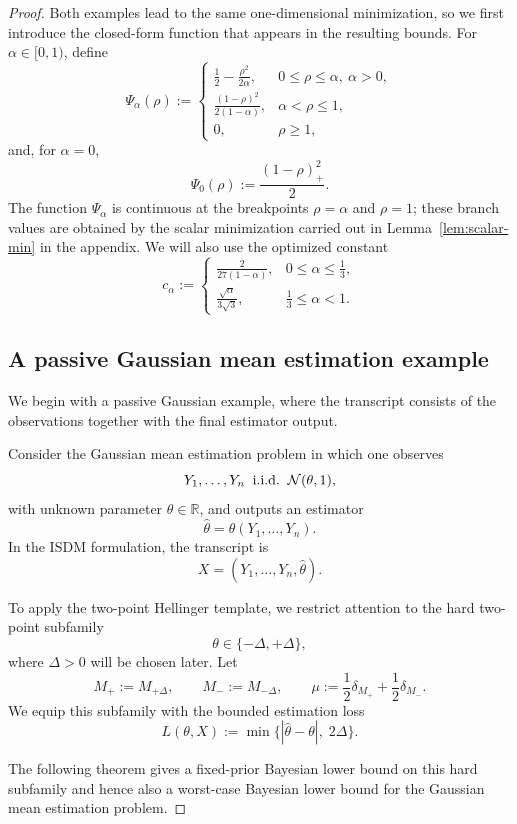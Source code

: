 \documentclass[conference]{IEEEtran}
\begin{document}
\begin{proof}[Proof]
Both examples lead to the same one-dimensional minimization, so we first introduce the closed-form function that appears in the resulting bounds. For \(\alpha\in[0,1)\), define
\[
\Psi_\alpha(\rho):=
\begin{cases}
\displaystyle
\frac12-\frac{\rho^2}{2\alpha},
& 0\le \rho\le \alpha,\ \alpha>0,\\[2ex]
\displaystyle
\frac{(1-\rho)^2}{2(1-\alpha)},
& \alpha<\rho\le 1,\\[2ex]
0,
& \rho\ge 1,
\end{cases}
\]
and, for \(\alpha=0\),
\[
\Psi_0(\rho):=\frac{(1-\rho)_+^2}{2}.
\]
The function \(\Psi_\alpha\) is continuous at the breakpoints \(\rho=\alpha\) and \(\rho=1\); these branch values are obtained by the scalar minimization carried out in Lemma~\ref{lem:scalar-min} in the appendix. We will also use the optimized constant
\[
c_\alpha:=
\begin{cases}
\displaystyle
\frac{2}{27(1-\alpha)},
& 0\le \alpha\le \frac13,\\[2ex]
\displaystyle
\frac{\sqrt{\alpha}}{3\sqrt{3}},
& \frac13\le \alpha<1.
\end{cases}
\]

\subsection{A passive Gaussian mean estimation example}

We begin with a passive Gaussian example, where the transcript consists of the observations together with the final estimator output.

Consider the Gaussian mean estimation problem in which one observes
\[
Y_1,\dots,Y_n \;\;\textup{i.i.d.}\;\; \mathcal N(\theta,1),
\]
with unknown parameter \(\theta\in\mathbb R\), and outputs an estimator
\[
\widehat\theta=\widehat\theta(Y_1,\dots,Y_n).
\]
In the ISDM formulation, the transcript is
\[
X=(Y_1,\dots,Y_n,\widehat\theta).
\]

To apply the two-point Hellinger template, we restrict attention to the hard two-point subfamily
\[
\theta\in\{-\Delta,+\Delta\},
\]
where \(\Delta>0\) will be chosen later. Let
\[
M_+ := M_{+\Delta},\qquad M_-:=M_{-\Delta},
\qquad
\mu:=\frac12\delta_{M_+}+\frac12\delta_{M_-}.
\]
We equip this subfamily with the bounded estimation loss
\[
L(\theta,X):=\min\{|\widehat\theta-\theta|,\;2\Delta\}.
\]

The following theorem gives a fixed-prior Bayesian lower bound on this hard subfamily and hence also a worst-case Bayesian lower bound for the Gaussian mean estimation problem.


\end{proof}
\end{document}
